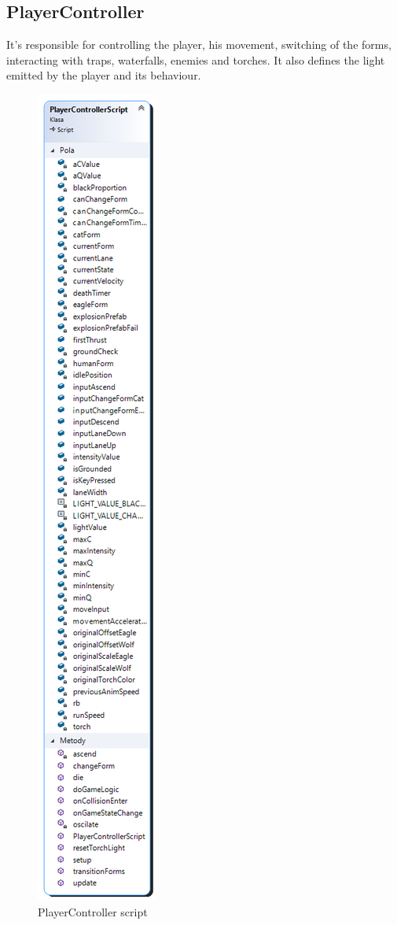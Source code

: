 \documentclass[12pt, english]{article}
\begin{document}
\subsection{PlayerController}
It's responsible for controlling the player, his movement, switching of the
forms, interacting with traps, waterfalls, enemies and torches. It also defines
the light emitted by the player and its behaviour.

\begin{figure}
	\centering
	\includegraphics[width=\textwidth, height=0.9\textheight, keepaspectratio]{image4.png}
	\caption{PlayerController script}
	\label{figure_playercontrollerscript}
\end{figure}
\end{document}
